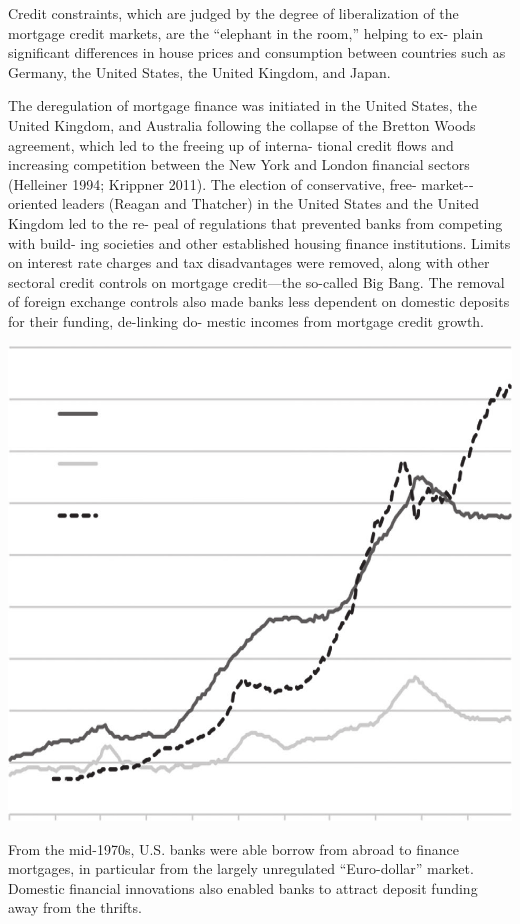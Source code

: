 \documentclass[
]{book}
\begin{document}
Credit
constraints, which are judged by the degree of liberalization of the
mortgage credit markets, are the ``elephant in the room,'' helping to ex-
plain significant differences in house prices and consumption between
countries such as Germany, the United States, the United Kingdom,
and Japan.

The deregulation of mortgage finance was initiated in the United
States, the United Kingdom, and Australia following the collapse of
the Bretton Woods agreement, which led to the freeing up of interna-
tional credit flows and increasing competition between the New York
and London financial sectors (Helleiner 1994; Krippner 2011). The
election of conservative, free-­
market-­
oriented leaders (Reagan and
Thatcher) in the United States and the United Kingdom led to the re-
peal of regulations that prevented banks from competing with build-
ing societies and other established housing finance institutions. Limits
on interest rate charges and tax disadvantages were removed, along
with other sectoral credit controls on mortgage credit---­the so-­called
Big Bang. The removal of foreign exchange controls also made banks
less dependent on domestic deposits for their funding, de-­linking do-
mestic incomes from mortgage credit growth.

\includegraphics{fig/UK_House_Price_vs_Credit.png}

From the mid-­1970s,
U.S. banks were able borrow from abroad to finance mortgages, in
particular from the largely unregulated ``Euro-­dollar'' market. Domestic
financial innovations also enabled banks to attract deposit funding
away from the thrifts.
\end{document}

